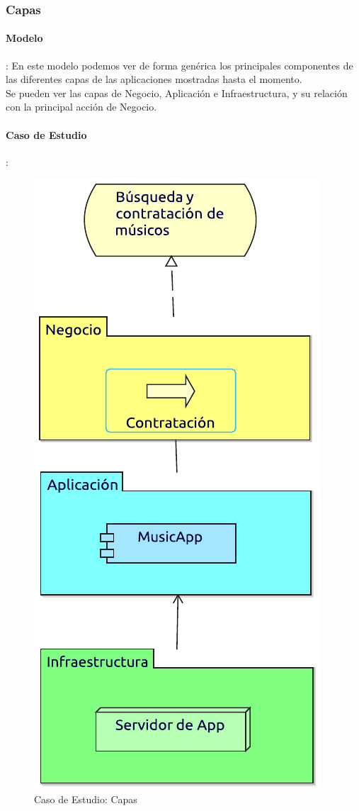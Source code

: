 \newpage

\subsubsection{Capas}
\paragraph{Modelo}:
En este modelo podemos ver de forma genérica los principales componentes de las diferentes capas de las aplicaciones mostradas hasta el momento. \\

Se pueden ver las capas de Negocio, Aplicación e Infraestructura, y su relación con la principal acción de Negocio.
\paragraph{Caso de Estudio}:

\begin{figure}[hbt!]
	\centering
	\includegraphics[width=0.4\linewidth]{Desarrollo/ArquitecturaEmpresarial/Tecnologia/imgs/capas.pdf}
	\caption{Caso de Estudio: Capas}
\end{figure}
